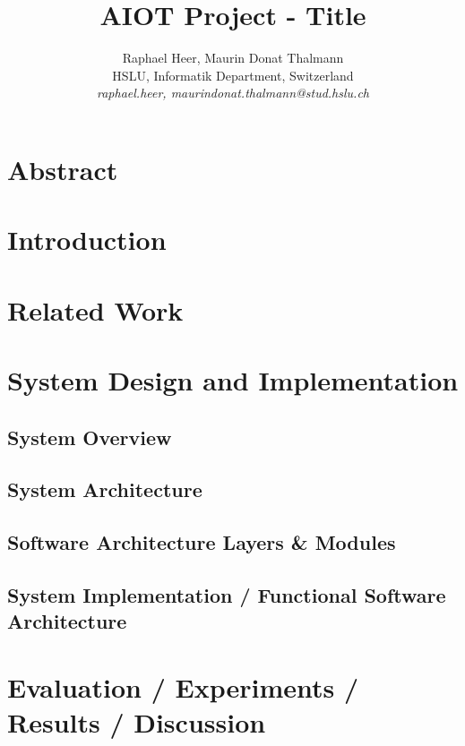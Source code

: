 \documentclass[a4paper]{article}
\title{\textbf{AIOT Project - Title}}
\author{Raphael Heer, Maurin Donat Thalmann\\
	HSLU, Informatik Department, Switzerland\\
	\emph{raphael.heer, maurindonat.thalmann@stud.hslu.ch}}
\begin{document}
	
	\maketitle
	\newpage
	\tableofcontents
	\newpage
	
	\section{Abstract}
	
	
	\section{Introduction}
	
	
	\section{Related Work}
	
	
	\section{System Design and Implementation}
	
	
		\subsection{System Overview}
		
		
		\subsection{System Architecture}
		
		
		\subsection{Software Architecture Layers \& Modules}
		
		
		\subsection{System Implementation / Functional Software Architecture}
		
		
	\section{Evaluation / Experiments / Results / Discussion}
	
	
	
	
	
	
	
\end{document}
